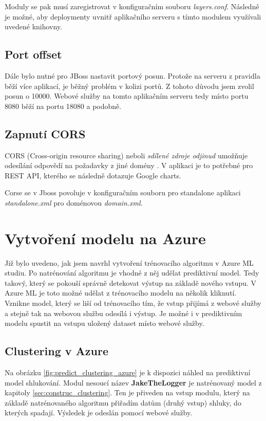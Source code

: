 \documentclass[thesis=M,czech]{FITthesis}[2012/10/20]
\begin{document}
		Moduly se pak musí zaregistrovat v konfiguračním souboru \textit{layers.conf}. Následně je možné, aby deploymenty uvnitř aplikačního serveru s tímto modulem využívali uvedené knihovny.
		
		\subsection{Port offset}
		\label{sec:port-offset}
		Dále bylo nutné pro JBoss nastavit portový posun. Protože na serveru z pravidla běží více aplikací, je běžný problém v kolizi portů. Z tohoto důvodu jsem zvolil posun o 10000. Webové služby na tomto aplikačním serveru tedy místo portu 8080 běží na portu 18080 a podobně.
		
		\subsection{Zapnutí CORS}
		CORS (Cross-origin resource sharing) neboli \textit{sdílené zdroje odjinud} umožňuje odesílání odpovědí na požadavky z jiné domény \cite{CORS}. V aplikaci je to potřebné pro REST API, kterého se následně dotazuje Google charts.
		
		Corse se v Jboss povoluje v konfiguračním souboru pro standalone aplikaci \textit{standalone.xml} pro doménovou \textit{domain.xml}.
		
	
	\section{Vytvoření modelu na Azure}
		Již bylo uvedeno, jak jsem navrhl vytvoření trénovacího algoritmu v Azure ML studiu. Po natrénování algoritmu je vhodné z něj udělat prediktivní model. Tedy takový, který se pokouší správně detekovat výstup na základě nového vstupu. V Azure ML je toto možné udělat z trénovacího modelu na několik kliknutí. Vznikne model, který se liší od trénovacího tím, že vstup přijímá z webové služby a stejně tak na webovou službu odesílá i výstup. Je možné i v prediktivním modelu spustit na vstupu uložený dataset místo webové služby.
		
		\subsection{Clustering v Azure}
			Na obrázku \ref{fig:predict_clustering_azure} je k dispozici náhled na prediktivní model shlukování. Modul nesoucí název \textbf{JakeTheLogger} je natrénovaný model z kapitoly \ref{sec:construc_clustering}. Ten je přiveden na vstup modulu, který na základě natrénovaného algoritmu přiřadím datům (druhý vstup) shluky, do kterých spadají. Výsledek je odeslán pomocí webové služby. 
			
\end{document}
